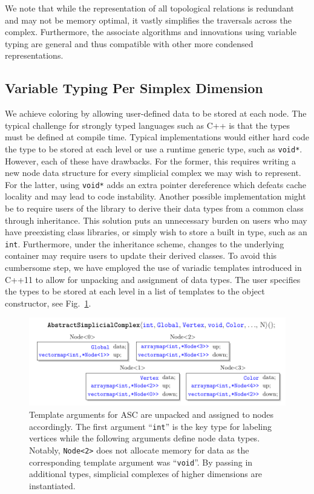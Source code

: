\par We note that while the representation of all topological relations is redundant and may not be memory optimal, it vastly simplifies the traversals across the complex.
Furthermore, the associate algorithms and innovations using variable typing are general and thus compatible with other more condensed representations.

\subsection{Variable Typing Per Simplex Dimension}

	\par We achieve coloring by allowing user-defined data to be stored at each node.
	The typical challenge for strongly typed languages such as C++ is that the types must be defined at compile time.
	Typical implementations would either hard code the type to be stored at each level or use a runtime generic type, such as \verb|void*|.
	However, each of these have drawbacks. For the former, this requires writing a new node data structure for every simplicial complex we may wish to represent.
	For the latter, using \verb|void*| adds an extra pointer dereference which defeats cache locality and may lead to code instability.
	Another possible implementation might be to require users of the library to derive their data types from a common class through inheritance.
	This solution puts an unnecessary burden on users who may have preexisting class libraries, or simply wish to store a built in type, such as an \verb|int|.
	Furthermore, under the inheritance scheme, changes to the underlying container may require users to update their derived classes.
	To avoid this cumbersome step, we have employed the use of variadic templates introduced in C++11 to allow for unpacking and assignment of data types.
	The user specifies the types to be stored at each level in a list of templates to the object constructor, see Fig.~\ref{fig:unpacking}.

\begin{figure}[ht!]
	\centering
	\includegraphics[width=\textwidth]{Figures/unpacking/unpacking}
	\caption{
		Template arguments for ASC are unpacked and assigned to nodes accordingly. The first argument ``\texttt{int}'' is the key type for labeling vertices while the following arguments define node data types. Notably, \texttt{Node<2>} does not allocate memory for data as the corresponding template argument was ``\texttt{void}''. By passing in additional types, simplicial complexes of higher dimensions are instantiated.
	}
	\label{fig:unpacking}
\end{figure}

